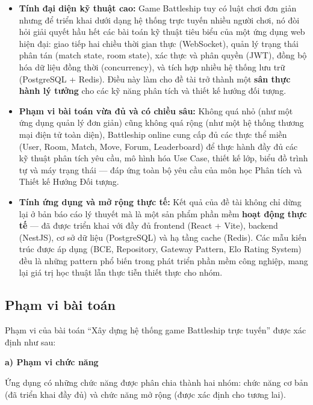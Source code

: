 \documentclass[13pt, a4paper]{extreport}
\begin{document}
\begin{itemize}
  \item \textbf{Tính đại diện kỹ thuật cao:} Game Battleship tuy có luật chơi đơn giản nhưng để
    triển khai dưới dạng hệ thống trực tuyến nhiều người chơi, nó đòi hỏi giải quyết hầu hết các
    bài toán kỹ thuật tiêu biểu của một ứng dụng web hiện đại: giao tiếp hai chiều thời gian thực
    (WebSocket), quản lý trạng thái phân tán (match state, room state), xác thực và phân quyền
    (JWT), đồng bộ hóa dữ liệu đồng thời (concurrency), và tích hợp nhiều hệ thống lưu trữ
    (PostgreSQL + Redis). Điều này làm cho đề tài trở thành một \textbf{sân thực hành lý tưởng}
    cho các kỹ năng phân tích và thiết kế hướng đối tượng.

  \item \textbf{Phạm vi bài toán vừa đủ và có chiều sâu:} Không quá nhỏ (như một ứng dụng quản lý
    đơn giản) cũng không quá rộng (như một hệ thống thương mại điện tử toàn diện), Battleship
    online cung cấp đủ các thực thể miền (User, Room, Match, Move, Forum, Leaderboard) để thực
    hành đầy đủ các kỹ thuật phân tích yêu cầu, mô hình hóa Use Case, thiết kế lớp, biểu đồ trình
    tự và máy trạng thái — đáp ứng toàn bộ yêu cầu của môn học Phân tích và Thiết kế Hướng Đối
    tượng.

  \item \textbf{Tính ứng dụng và mở rộng thực tế:} Kết quả của đề tài không chỉ dừng lại ở bản
    báo cáo lý thuyết mà là một sản phẩm phần mềm \textbf{hoạt động thực tế} — đã được triển khai
    với đầy đủ frontend (React + Vite), backend (NestJS), cơ sở dữ liệu (PostgreSQL) và hạ tầng
    cache (Redis). Các mẫu kiến trúc được áp dụng (BCE, Repository, Gateway Pattern, Elo Rating
    System) đều là những pattern phổ biến trong phát triển phần mềm công nghiệp, mang lại giá trị
    học thuật lẫn thực tiễn thiết thực cho nhóm.
\end{itemize}

\subsection{Phạm vi bài toán}

Phạm vi của bài toán ``Xây dựng hệ thống game Battleship trực tuyến'' được xác định như sau:

\textbf{a) Phạm vi chức năng}

Ứng dụng có những chức năng được phân chia thành hai nhóm: chức năng cơ bản (đã triển khai đầy đủ)
và chức năng mở rộng (được xác định cho tương lai).
\end{document}

